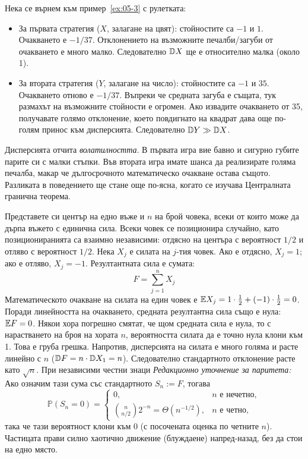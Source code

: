 Нека се върнем към пример~\ref{ex:05-3} с рулетката:
\begin{itemize}
    \item За първата стратегия ($X$, залагане на цвят): стойностите са $-1$ и $1$. Очакването е $-1/37$. Отклонението на възможните печалби/загуби от очакването е много малко. Следователно $\mathbb{D} X$ ще е относително малка (около 1).
    \item За втората стратегия ($Y$, залагане на число): стойностите са $-1$ и $35$. Очакването отново е $-1/37$. Въпреки че средната загуба е същата, тук размахът на възможните стойности е огромен. Ако извадите очакването от 35, получавате голямо отклонение, което повдигнато на квадрат дава още по-голям принос към дисперсията. Следователно $\mathbb{D} Y \gg \mathbb{D} X$.
\end{itemize}
Дисперсията отчита \emph{волатилността}. В първата игра вие бавно и сигурно губите парите си с малки стъпки. Във втората игра имате шанса да реализирате голяма печалба, макар че дългосрочното математическо очакване остава същото. Разликата в поведението ще стане още по-ясна, когато се изучава Централната гранична теорема.

\begin{example}\label{ex:05-4}
Представете си център на едно въже и $n$ на брой човека, всеки от които може да дърпа въжето с единична сила. Всеки човек се позиционира случайно, като позициониранията са взаимно независими: отдясно на центъра с вероятност $1/2$ и отляво с вероятност $1/2$.
Нека $X_j$ е силата на $j$-тия човек. Ако е отдясно, $X_j = 1$; ако е отляво, $X_j = -1$.
Резултантната сила е сумата:
\[ F = \sum_{j=1}^n X_j \]
Математическото очакване на силата на един човек е $\mathbb{E} X_j = 1 \cdot \frac{1}{2} + (-1) \cdot \frac{1}{2} = 0$. Поради линейността на очакването, средната резултантна сила също е нула: $\mathbb{E} F = 0$.
Някои хора погрешно смятат, че щом средната сила е нула, то с нарастването на броя на хората $n$, вероятността силата да е точно нула клони към 1. Това е груба грешка. Напротив, дисперсията на силата е много голяма и расте линейно с $n$ ($\mathbb{D} F = n \cdot \mathbb{D} X_1 = n$). Следователно стандартното отклонение расте като $\sqrt{n}$. При независими честни знаци
\emph{Редакционно уточнение за паритета:} Ако означим тази сума със стандартното
$S_n:=F$, тогава
\[
\mathbb P(S_n=0)=
\begin{cases}
0, & n\text{ е нечетно},\\
\binom{n}{n/2}2^{-n}=\Theta(n^{-1/2}), & n\text{ е четно},
\end{cases}
\]
така че тази вероятност клони към $0$ (с посочената оценка по четните $n$). Частицата прави силно хаотично движение (блуждаене) напред-назад, без да стои на едно място.

\end{example}

